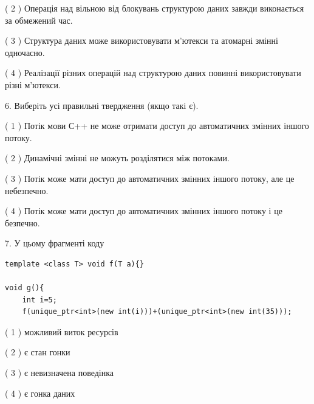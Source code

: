 \documentclass[12pt, ukrainian]{article}
\begin{document}
\begin {large}
{( 2 ) Операція над вільною від блокувань структурою даних завжди виконається за обмежений час.%

( 3 ) Структура даних може використовувати м’ютекси та атомарні змінні одночасно.%

( 4 ) Реалізації різних операцій над структурою даних повинні використовувати різні м’ютекси.%
\newpage



\vspace{5mm}
6. Виберіть усі правильні твердження (якщо такі є).\par
\vspace{2mm}

( 1 ) Потік мови С++ не може отримати доступ до автоматичних змінних іншого потоку.%

( 2 ) Динамічні змінні не можуть розділятися між потоками.%

( 3 ) Потік може мати доступ до автоматичних змінних іншого потоку, але це небезпечно.%

( 4 ) Потік може мати доступ до автоматичних змінних іншого потоку і це безпечно.%


\vspace{5mm}
7. У цьому фрагменті коду
\begin{verbatim}
template <class T> void f(T a){}

void g(){
    int i=5;
    f(unique_ptr<int>(new int(i)))+(unique_ptr<int>(new int(35)));
\end{verbatim}
( 1 ) можливий виток ресурсів%

( 2 ) є стан гонки%

( 3 ) є невизначена поведінка%

( 4 ) є гонка даних%
}
\end {large}
\end{document}
